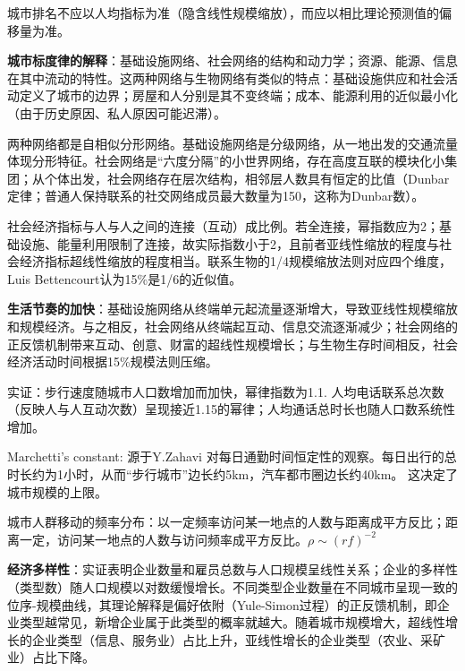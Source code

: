 \par 城市排名不应以人均指标为准（隐含线性规模缩放），而应以相比理论预测值的偏移量为准。

\par \textbf{城市标度律的解释}：基础设施网络、社会网络的结构和动力学；资源、能源、信息在其中流动的特性。这两种网络与生物网络有类似的特点：基础设施供应和社会活动定义了城市的边界；房屋和人分别是其不变终端；成本、能源利用的近似最小化（由于历史原因、私人原因可能迟滞）。

\par 两种网络都是自相似分形网络。基础设施网络是分级网络，从一地出发的交通流量体现分形特征。社会网络是“六度分隔”的小世界网络，存在高度互联的模块化小集团；从个体出发，社会网络存在层次结构，相邻层人数具有恒定的比值（Dunbar定律；普通人保持联系的社交网络成员最大数量为150，这称为Dunbar数）。

\par 社会经济指标与人与人之间的连接（互动）成比例。若全连接，幂指数应为2；基础设施、能量利用限制了连接，故实际指数小于2，且前者亚线性缩放的程度与社会经济指标超线性缩放的程度相当。联系生物的1/4规模缩放法则对应四个维度，Luis Bettencourt认为15\%是1/6的近似值。

\par \textbf{生活节奏的加快}：基础设施网络从终端单元起流量逐渐增大，导致亚线性规模缩放和规模经济。与之相反，社会网络从终端起互动、信息交流逐渐减少；社会网络的正反馈机制带来互动、创意、财富的超线性规模增长；与生物生存时间相反，社会经济活动时间根据15\%规模法则压缩。

\par 实证：步行速度随城市人口数增加而加快，幂律指数为1.1. 人均电话联系总次数（反映人与人互动次数）呈现接近1.15的幂律；人均通话总时长也随人口数系统性增加。

\par Marchetti's constant: 源于Y.Zahavi 对每日通勤时间恒定性的观察。每日出行的总时长约为1小时，从而“步行城市”边长约5km，汽车都市圈边长约40km。 这决定了城市规模的上限。

\par 城市人群移动的频率分布：以一定频率访问某一地点的人数与距离成平方反比；距离一定，访问某一地点的人数与访问频率成平方反比。$\rho \sim (rf)^{-2}$

\par \textbf{经济多样性}：实证表明企业数量和雇员总数与人口规模呈线性关系；企业的多样性（类型数）随人口规模以对数缓慢增长。不同类型企业数量在不同城市呈现一致的位序-规模曲线，其理论解释是偏好依附（Yule-Simon过程）的正反馈机制，即企业类型越常见，新增企业属于此类型的概率就越大。随着城市规模增大，超线性增长的企业类型（信息、服务业）占比上升，亚线性增长的企业类型（农业、采矿业）占比下降。


